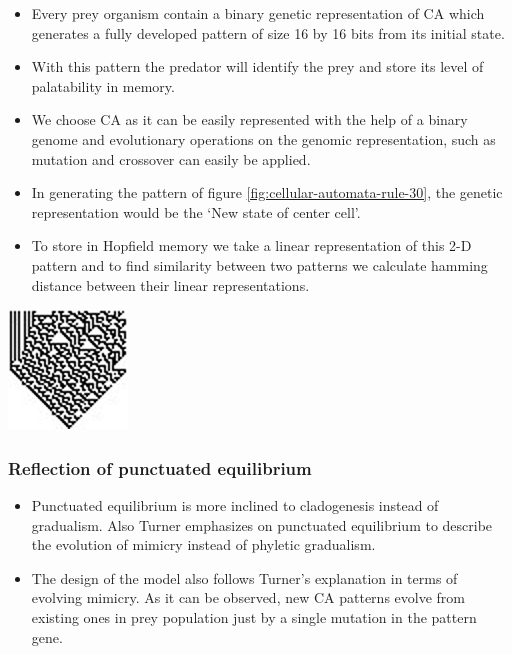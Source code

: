 \documentclass[a0,landscape]{a0poster}
\begin{document}
\begin{multicols}{5}
\begin{itemize}
	\item Every prey organism contain a binary genetic representation of CA which generates a fully developed pattern of size 16 by 16 bits from its initial state.
	\item With this pattern the predator will identify the prey and store its level of palatability in memory. 
	\item We choose CA as it can be easily represented with the help of a binary genome and evolutionary operations on the genomic representation, such as mutation and crossover can easily be applied. 
	\item In generating the pattern of figure \ref{fig:cellular-automata-rule-30}, the genetic representation would be the `New state of center cell'. 
	\item To store in Hopfield memory we take a linear representation of this 2-D pattern and to find similarity between two patterns we calculate hamming distance between their linear representations.
\end{itemize}

\begin{center}\vspace{1cm}
\includegraphics[width=0.1\linewidth]{CARule30-large.png}
\label{fig:cellular-automata-rule-30}
\end{center}\vspace{1cm}

\color{SaddleBrown} 
\subsubsection*{Reflection of punctuated equilibrium}
\label{subsubsec:reflection-of-punctuated-equilibrium}

\begin{itemize}
	\item Punctuated equilibrium is more inclined to cladogenesis instead of gradualism. Also Turner \citep{turner1988} emphasizes on punctuated equilibrium to describe the evolution of mimicry instead of phyletic gradualism. 
	\item The design of the model also follows Turner's explanation in terms of evolving mimicry. As it can be observed, new CA patterns evolve from existing ones in prey population just by a single mutation in the pattern gene. 
\end{itemize}


\end{multicols}
\end{document}
